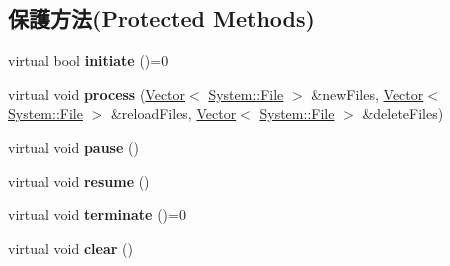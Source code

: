 \subsection*{保護方法(Protected Methods)}
\begin{DoxyCompactItemize}
\item 
virtual bool {\bfseries initiate} ()=0\hypertarget{class_magnum_1_1_resource_import_1_1_i_creator_ae117b56cd493ab8a74397e69aec0dace}{}\label{class_magnum_1_1_resource_import_1_1_i_creator_ae117b56cd493ab8a74397e69aec0dace}

\item 
virtual void {\bfseries process} (\hyperlink{class_magnum_1_1_vector}{Vector}$<$ \hyperlink{class_magnum_1_1_system_1_1_file}{System\+::\+File} $>$ \&new\+Files, \hyperlink{class_magnum_1_1_vector}{Vector}$<$ \hyperlink{class_magnum_1_1_system_1_1_file}{System\+::\+File} $>$ \&reload\+Files, \hyperlink{class_magnum_1_1_vector}{Vector}$<$ \hyperlink{class_magnum_1_1_system_1_1_file}{System\+::\+File} $>$ \&delete\+Files)\hypertarget{class_magnum_1_1_resource_import_1_1_i_creator_a2452fd5415e67d860991de3272015241}{}\label{class_magnum_1_1_resource_import_1_1_i_creator_a2452fd5415e67d860991de3272015241}

\item 
virtual void {\bfseries pause} ()\hypertarget{class_magnum_1_1_resource_import_1_1_i_creator_a7904d424241347df90c2aa5e69d4057b}{}\label{class_magnum_1_1_resource_import_1_1_i_creator_a7904d424241347df90c2aa5e69d4057b}

\item 
virtual void {\bfseries resume} ()\hypertarget{class_magnum_1_1_resource_import_1_1_i_creator_a86c78834d1511371555689140f6f1807}{}\label{class_magnum_1_1_resource_import_1_1_i_creator_a86c78834d1511371555689140f6f1807}

\item 
virtual void {\bfseries terminate} ()=0\hypertarget{class_magnum_1_1_resource_import_1_1_i_creator_afc65c84c36b1644f94b3f935e1092914}{}\label{class_magnum_1_1_resource_import_1_1_i_creator_afc65c84c36b1644f94b3f935e1092914}

\item 
virtual void {\bfseries clear} ()\hypertarget{class_magnum_1_1_resource_import_1_1_i_creator_a1dd6ced6744a0ca738a39d960a936ed2}{}\label{class_magnum_1_1_resource_import_1_1_i_creator_a1dd6ced6744a0ca738a39d960a936ed2}

\end{DoxyCompactItemize}

